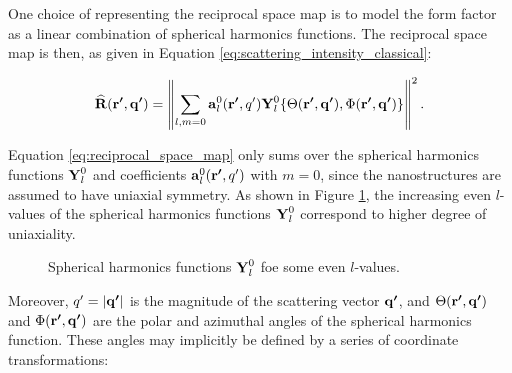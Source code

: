 
One choice of representing the reciprocal space map is to model the form factor as a linear combination of spherical harmonics functions.
The reciprocal space map is then,
as given in Equation \eqref{eq:scattering_intensity_classical}:

\begin{equation}\label{eq:reciprocal_space_map}
    \bm{\mathrm{\widehat{R}}}(\bm{\mathrm{r'}}, \bm{\mathrm{q'}}) = \left\| \sum_{l, m=0} \bm{\mathrm{a}}_{l}^{0}(\bm{\mathrm{r'}}, q') \bm{\mathrm{Y}}_{l}^{0} \{ \Theta(\bm{\mathrm{r'}}, \bm{\mathrm{q'}}), \Phi(\bm{\mathrm{r'}}, \bm{\mathrm{q'}}) \} \right\|^{2}.
\end{equation}

Equation \eqref{eq:reciprocal_space_map} only sums over the spherical harmonics functions $\bm{\mathrm{Y}}_{l}^{0}$ and coefficients $\bm{\mathrm{a}}_{l}^{0}(\bm{\mathrm{r'}}, q')$ with $m=0$, since the nanostructures are assumed to have uniaxial symmetry.
As shown in Figure \ref{fig:spherical_harmonics}, the increasing even $l$-values of the spherical harmonics functions $\bm{\mathrm{Y}}_{l}^{0}$ correspond to higher degree of uniaxiality.

\begin{figure}[h!]
    \centering
    
    \caption{Spherical harmonics functions $\bm{\mathrm{Y}}_{l}^{0}$ foe some even $l$-values.
    }
    \label{fig:spherical_harmonics}
\end{figure}


Moreover, $q' = |\bm{\mathrm{q'}}|$ is the magnitude of the scattering vector $\bm{\mathrm{q'}}$, and $\Theta(\bm{\mathrm{r'}}, \bm{\mathrm{q'}})$ and $\Phi(\bm{\mathrm{r'}}, \bm{\mathrm{q'}})$ are the polar and azimuthal angles of the spherical harmonics function.
These angles may implicitly be defined by a series of coordinate transformations:

